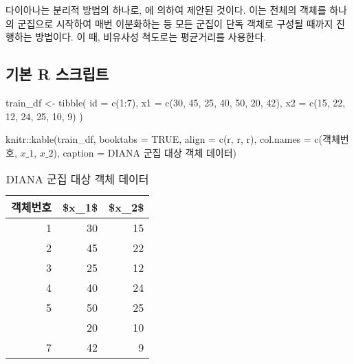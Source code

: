 \documentclass[
]{book}
\newenvironment{Shaded}{\begin{snugshade}}{\end{snugshade}}
\newcommand{\AttributeTok}[1]{\textcolor[rgb]{0.77,0.63,0.00}{#1}}
\newcommand{\ConstantTok}[1]{\textcolor[rgb]{0.00,0.00,0.00}{#1}}
\newcommand{\DecValTok}[1]{\textcolor[rgb]{0.00,0.00,0.81}{#1}}
\newcommand{\FunctionTok}[1]{\textcolor[rgb]{0.00,0.00,0.00}{#1}}
\newcommand{\NormalTok}[1]{#1}
\newcommand{\OtherTok}[1]{\textcolor[rgb]{0.56,0.35,0.01}{#1}}
\newcommand{\SpecialCharTok}[1]{\textcolor[rgb]{0.00,0.00,0.00}{#1}}
\newcommand{\StringTok}[1]{\textcolor[rgb]{0.31,0.60,0.02}{#1}}
\begin{document}
다이아나는 분리적 방법의 하나로, \citet{kaufman1990finding} 에 의하여 제안된 것이다. 이는 전체의 객체를 하나의 군집으로 시작하여 매번 이분화하는 등 모든 군집이 단독 객체로 구성될 때까지 진행하는 방법이다. 이 때, 비유사성 척도로는 평균거리를 사용한다.

\hypertarget{diana-basic-script}{%
\subsection{기본 R 스크립트}\label{diana-basic-script}}

\begin{Shaded}
\begin{Highlighting}[]
\NormalTok{train\_df }\OtherTok{\textless{}{-}} \FunctionTok{tibble}\NormalTok{(}
  \AttributeTok{id =} \FunctionTok{c}\NormalTok{(}\DecValTok{1}\SpecialCharTok{:}\DecValTok{7}\NormalTok{),}
  \AttributeTok{x1 =} \FunctionTok{c}\NormalTok{(}\DecValTok{30}\NormalTok{, }\DecValTok{45}\NormalTok{, }\DecValTok{25}\NormalTok{, }\DecValTok{40}\NormalTok{, }\DecValTok{50}\NormalTok{, }\DecValTok{20}\NormalTok{, }\DecValTok{42}\NormalTok{),}
  \AttributeTok{x2 =} \FunctionTok{c}\NormalTok{(}\DecValTok{15}\NormalTok{, }\DecValTok{22}\NormalTok{, }\DecValTok{12}\NormalTok{, }\DecValTok{24}\NormalTok{, }\DecValTok{25}\NormalTok{, }\DecValTok{10}\NormalTok{, }\DecValTok{9}\NormalTok{)}
\NormalTok{)}

\NormalTok{knitr}\SpecialCharTok{::}\FunctionTok{kable}\NormalTok{(train\_df, }\AttributeTok{booktabs =} \ConstantTok{TRUE}\NormalTok{,}
             \AttributeTok{align =} \FunctionTok{c}\NormalTok{(}\StringTok{\textquotesingle{}r\textquotesingle{}}\NormalTok{, }\StringTok{\textquotesingle{}r\textquotesingle{}}\NormalTok{, }\StringTok{\textquotesingle{}r\textquotesingle{}}\NormalTok{),}
             \AttributeTok{col.names =} \FunctionTok{c}\NormalTok{(}\StringTok{\textquotesingle{}객체번호\textquotesingle{}}\NormalTok{, }\StringTok{\textquotesingle{}$x\_1$\textquotesingle{}}\NormalTok{, }\StringTok{\textquotesingle{}$x\_2$\textquotesingle{}}\NormalTok{),}
             \AttributeTok{caption =} \StringTok{\textquotesingle{}DIANA 군집 대상 객체 데이터\textquotesingle{}}\NormalTok{)}
\end{Highlighting}
\end{Shaded}

\begin{table}

\caption{\label{tab:diana-data}DIANA 군집 대상 객체 데이터}
\centering
\begin{tabular}[t]{rrr}
\toprule
객체번호 & \$x\_1\$ & \$x\_2\$\\
\midrule
1 & 30 & 15\\
2 & 45 & 22\\
3 & 25 & 12\\
4 & 40 & 24\\
5 & 50 & 25\\
\addlinespace
6 & 20 & 10\\
7 & 42 & 9\\
\bottomrule
\end{tabular}
\end{table}
\end{document}
